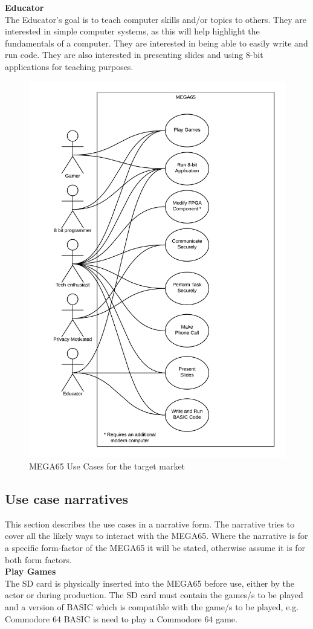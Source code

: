 \textbf{Educator}\\
The Educator's goal is to teach computer skills and/or topics to others. They are interested in simple computer systems, as this will help highlight the fundamentals of a computer. They are interested in being able to easily write and run code. They are also interested in presenting slides and using 8-bit applications for teaching purposes.\\

\begin{figure} \begin{center}
\includegraphics[width=.6\linewidth]{pics/MEGA65_use_case} 
\end{center} 
\caption{MEGA65 Use Cases for the target market\\}
\label{MEGA65_use_cases}
\end{figure}

\subsection{Use case narratives}
This section describes the use cases in a narrative form. The narrative tries to cover all the likely ways to interact with the MEGA65. Where the narrative is for a specific form-factor of the MEGA65 it will be stated, otherwise assume it is for both form factors. \\

\textbf{Play Games}\\
The SD card is physically inserted into the MEGA65 before use, either by the actor or during production. The SD card must contain the games/s to be played and a version of BASIC which is compatible with the game/s to be played, e.g. Commodore 64 BASIC is need to play a Commodore 64 game.

